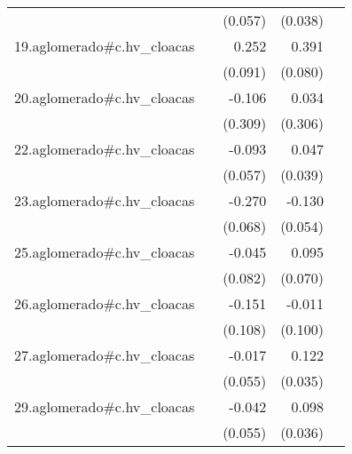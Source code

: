 {\begin{longtable}{l*{4}{D{.}{.}{-1}}}
            &                     &     (0.057)         &     (0.038)         &                     \\
\addlinespace
19.aglomerado#c.hv\_cloacas&                     &       0.252\sym{**} &       0.391\sym{***}&                     \\
            &                     &     (0.091)         &     (0.080)         &                     \\
\addlinespace
20.aglomerado#c.hv\_cloacas&                     &      -0.106         &       0.034         &                     \\
            &                     &     (0.309)         &     (0.306)         &                     \\
\addlinespace
22.aglomerado#c.hv\_cloacas&                     &      -0.093         &       0.047         &                     \\
            &                     &     (0.057)         &     (0.039)         &                     \\
\addlinespace
23.aglomerado#c.hv\_cloacas&                     &      -0.270\sym{***}&      -0.130\sym{*}  &                     \\
            &                     &     (0.068)         &     (0.054)         &                     \\
\addlinespace
25.aglomerado#c.hv\_cloacas&                     &      -0.045         &       0.095         &                     \\
            &                     &     (0.082)         &     (0.070)         &                     \\
\addlinespace
26.aglomerado#c.hv\_cloacas&                     &      -0.151         &      -0.011         &                     \\
            &                     &     (0.108)         &     (0.100)         &                     \\
\addlinespace
27.aglomerado#c.hv\_cloacas&                     &      -0.017         &       0.122\sym{***}&                     \\
            &                     &     (0.055)         &     (0.035)         &                     \\
\addlinespace
29.aglomerado#c.hv\_cloacas&                     &      -0.042         &       0.098\sym{**} &                     \\
            &                     &     (0.055)         &     (0.036)         &                     \\

\end{longtable}}
